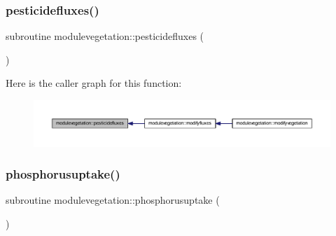 \subsubsection{\texorpdfstring{pesticidefluxes()}{pesticidefluxes()}}
{\footnotesize\ttfamily subroutine modulevegetation\+::pesticidefluxes (\begin{DoxyParamCaption}{ }\end{DoxyParamCaption})\hspace{0.3cm}{\ttfamily [private]}}

Here is the caller graph for this function\+:\nopagebreak
\begin{figure}[H]
\begin{center}
\leavevmode
\includegraphics[width=350pt]{namespacemodulevegetation_af6d8868a0a498022d072c484bbfc5f73_icgraph}
\end{center}
\end{figure}
\mbox{\label{namespacemodulevegetation_a8ecdc6f2c513a0f8920f448525858005}} 
\subsubsection{\texorpdfstring{phosphorusuptake()}{phosphorusuptake()}}
{\footnotesize\ttfamily subroutine modulevegetation\+::phosphorusuptake (\begin{DoxyParamCaption}{ }\end{DoxyParamCaption})\hspace{0.3cm}{\ttfamily [private]}}

